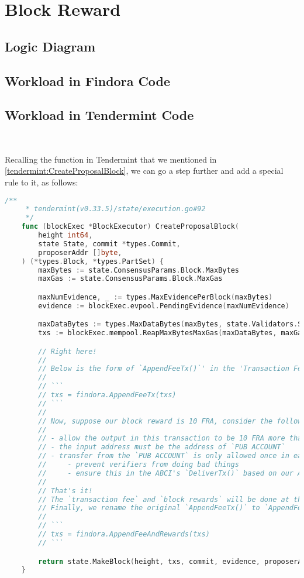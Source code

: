 \section{Block Reward}

\subsection{Logic Diagram}

\subsection{Workload in Findora Code}

\subsection{Workload in Tendermint Code}

~\par

Recalling the  function in Tendermint that we mentioned in \ref{tendermint:CreateProposalBlock},
we can go a step further and add a special rule to it, as follows:

\begin{lstlisting}[language=go]
    /**
     * tendermint(v0.33.5)/state/execution.go#92
     */
    func (blockExec *BlockExecutor) CreateProposalBlock(
        height int64,
        state State, commit *types.Commit,
        proposerAddr []byte,
    ) (*types.Block, *types.PartSet) {
        maxBytes := state.ConsensusParams.Block.MaxBytes
        maxGas := state.ConsensusParams.Block.MaxGas

        maxNumEvidence, _ := types.MaxEvidencePerBlock(maxBytes)
        evidence := blockExec.evpool.PendingEvidence(maxNumEvidence)

        maxDataBytes := types.MaxDataBytes(maxBytes, state.Validators.Size(), len(evidence))
        txs := blockExec.mempool.ReapMaxBytesMaxGas(maxDataBytes, maxGas)

        // Right here!
        //
        // Below is the form of `AppendFeeTx()`' in the 'Transaction Fee' section:
        //
        // ```
        // txs = findora.AppendFeeTx(txs)
        // ```
        //
        // Now, suppose our block reward is 10 FRA, consider the following rules:
        //
        // - allow the output in this transaction to be 10 FRA more than the input
        // - the input address must be the address of `PUB ACCOUNT`
        // - transfer from the `PUB ACCOUNT` is only allowed once in each block
        //     - prevent verifiers from doing bad things
        //     - ensure this in the ABCI's `DeliverTx()` based on our APP logic
        //
        // That's it!
        // The `transaction fee` and `block rewards` will be done at the same time.
        // Finally, we rename the original `AppendFeeTx()` to `AppendFeeAndRewards()`:
        //
        // ```
        // txs = findora.AppendFeeAndRewards(txs)
        // ```

        return state.MakeBlock(height, txs, commit, evidence, proposerAddr)
    }
\end{lstlisting}
